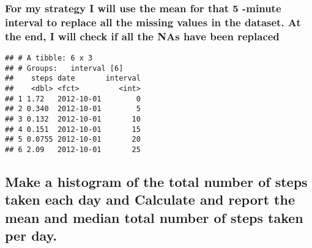 \documentclass[]{article}
\newenvironment{Shaded}{\begin{snugshade}}{\end{snugshade}}
\newcommand{\KeywordTok}[1]{\textcolor[rgb]{0.13,0.29,0.53}{\textbf{#1}}}
\newcommand{\DataTypeTok}[1]{\textcolor[rgb]{0.13,0.29,0.53}{#1}}
\newcommand{\DecValTok}[1]{\textcolor[rgb]{0.00,0.00,0.81}{#1}}
\newcommand{\StringTok}[1]{\textcolor[rgb]{0.31,0.60,0.02}{#1}}
\newcommand{\OtherTok}[1]{\textcolor[rgb]{0.56,0.35,0.01}{#1}}
\newcommand{\ControlFlowTok}[1]{\textcolor[rgb]{0.13,0.29,0.53}{\textbf{#1}}}
\newcommand{\OperatorTok}[1]{\textcolor[rgb]{0.81,0.36,0.00}{\textbf{#1}}}
\newcommand{\NormalTok}[1]{#1}
\begin{document}
\subsubsection{For my strategy I will use the mean for that 5 -minute
interval to replace all the missing values in the dataset. At the end, I
will check if all the NAs have been
replaced}\label{for-my-strategy-i-will-use-the-mean-for-that-5--minute-interval-to-replace-all-the-missing-values-in-the-dataset.-at-the-end-i-will-check-if-all-the-nas-have-been-replaced}

\begin{Shaded}
\end{Shaded}

\begin{verbatim}
## # A tibble: 6 x 3
## # Groups:   interval [6]
##    steps date       interval
##    <dbl> <fct>         <int>
## 1 1.72   2012-10-01        0
## 2 0.340  2012-10-01        5
## 3 0.132  2012-10-01       10
## 4 0.151  2012-10-01       15
## 5 0.0755 2012-10-01       20
## 6 2.09   2012-10-01       25
\end{verbatim}

\subsection{Make a histogram of the total number of steps taken each day
and Calculate and report the mean and median total number of steps taken
per
day.}\label{make-a-histogram-of-the-total-number-of-steps-taken-each-day-and-calculate-and-report-the-mean-and-median-total-number-of-steps-taken-per-day.}

\begin{Shaded}
\end{Shaded}
\end{document}
